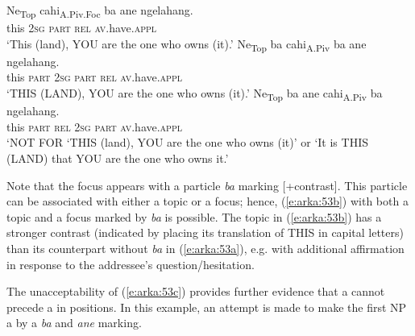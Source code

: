 \documentclass[output=paper
,modfonts
,nonflat]{langsci/langscibook}
\begin{document}
\begin{exe}
	\ex\label{e:arka:53}
	\begin{xlist}
		\ex\label{e:arka:53a}
		\gll {\ob}Ne{\cb}\textsubscript{Top}  {\ob}cahi{\cb}\textsubscript{A.Piv.Foc}   ba   ane  ngelahang. \\
		\phantom{[}this   \phantom{[}2\textsc{sg}  \textsc{part}  \textsc{rel}  \textsc{av}.have.\textsc{appl}\\
		\glt ‘This (land), YOU are the one who owns (it).’
		\ex\label{e:arka:53b}
		\gll {\ob}Ne{\cb}\textsubscript{Top}  ba  {\ob}cahi{\cb}\textsubscript{A.Piv}   {\USOParen}ba{\USCParen}  ane   ngelahang. \\
		\phantom{[}this   \textsc{part}  \phantom{[}2\textsc{sg}  \phantom{(}\textsc{part}  \textsc{rel}  \textsc{av}.have.\textsc{appl}\\
		\glt ‘THIS (LAND), YOU are the one who owns (it).’
		\ex\label{e:arka:53c}
		\gll {\USStar} {\ob}Ne{\cb}\textsubscript{Top}  ba  ane   {\ob}cahi{\cb}\textsubscript{A.Piv}   {\USOParen}ba{\USCParen}  ngelahang. \\
		\phantom{*} \phantom{[}this   \textsc{part}  \textsc{rel}   \phantom{[}2\textsc{sg}  \phantom{(}\textsc{part}  \textsc{av}.have.\textsc{appl}\\
		\glt ‘NOT FOR ‘THIS (land), YOU are the one who owns (it)’ or	\glt ‘It is THIS (LAND) that YOU are the one who owns it.’ 
	\end{xlist}
\end{exe}

\noindent
Note that the focus appears with a particle \textit{ba} marking [+contrast]. This particle can be associated with either a topic or a focus; hence, (\ref{e:arka:53b}) with both a topic and a focus marked by \textit{ba} is possible. The topic in (\ref{e:arka:53b}) has a stronger contrast (indicated by placing its translation of THIS in capital letters) than its counterpart without \textit{ba} in (\ref{e:arka:53a}), e.g. with additional affirmation in response to the addressee’s question/hesitation. 

The unacceptability of (\ref{e:arka:53c}) provides further evidence that a  cannot precede a  in  positions. In this example, an attempt is made to make the first NP a  by a \textit{ba} and \textit{ane} marking.
\end{document}
